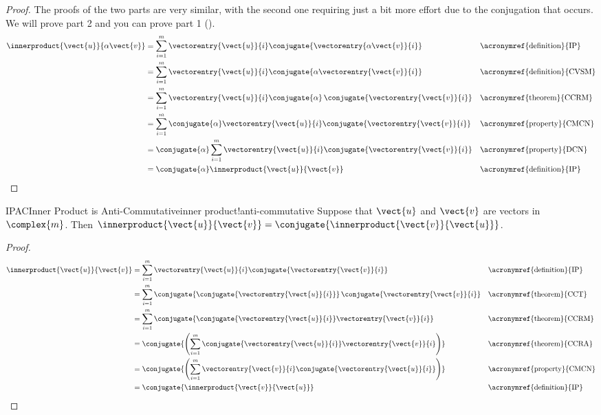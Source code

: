 \begin{proof}
The proofs of the two parts are very similar, with the second one requiring just a bit more effort due to the conjugation that occurs.  We will prove part 2 and you can prove part 1  ().
%
\begin{align*}
\innerproduct{\vect{u}}{\alpha\vect{v}}
&=\sum_{i=1}^{m}\vectorentry{\vect{u}}{i}\conjugate{\vectorentry{\alpha\vect{v}}{i}}
&&\text{\acronymref{definition}{IP}}\\
%
&=\sum_{i=1}^{m}\vectorentry{\vect{u}}{i}\conjugate{\alpha\vectorentry{\vect{v}}{i}}
&&\text{\acronymref{definition}{CVSM}}\\
%
&=\sum_{i=1}^{m}\vectorentry{\vect{u}}{i}\conjugate{\alpha}\,\conjugate{\vectorentry{\vect{v}}{i}}
&&\text{\acronymref{theorem}{CCRM}}\\
%
&=\sum_{i=1}^{m}\conjugate{\alpha}\vectorentry{\vect{u}}{i}\conjugate{\vectorentry{\vect{v}}{i}}
&&\text{\acronymref{property}{CMCN}}\\
%
&=\conjugate{\alpha}\sum_{i=1}^{m}\vectorentry{\vect{u}}{i}\conjugate{\vectorentry{\vect{v}}{i}}
&&\text{\acronymref{property}{DCN}}\\
%
&=\conjugate{\alpha}\innerproduct{\vect{u}}{\vect{v}}
&&\text{\acronymref{definition}{IP}}
%
\end{align*}
%
\end{proof}
%
\begin{theorem}{IPAC}{Inner Product is Anti-Commutative}{inner product!anti-commutative}
Suppose that $\vect{u}$ and $\vect{v}$ are vectors in $\complex{m}$.  Then
$\innerproduct{\vect{u}}{\vect{v}}=\conjugate{\innerproduct{\vect{v}}{\vect{u}}}$.
\end{theorem}
%
\begin{proof}
\begin{align*}
\innerproduct{\vect{u}}{\vect{v}}
&=\sum_{i=1}^{m}\vectorentry{\vect{u}}{i}\conjugate{\vectorentry{\vect{v}}{i}}
&&\text{\acronymref{definition}{IP}}\\
%
&=\sum_{i=1}^{m}\conjugate{\conjugate{\vectorentry{\vect{u}}{i}}}\,\conjugate{\vectorentry{\vect{v}}{i}}
&&\text{\acronymref{theorem}{CCT}}\\
%
&=\sum_{i=1}^{m}\conjugate{\conjugate{\vectorentry{\vect{u}}{i}}\vectorentry{\vect{v}}{i}}
&&\text{\acronymref{theorem}{CCRM}}\\
%
&=\conjugate{\left(\sum_{i=1}^{m}\conjugate{\vectorentry{\vect{u}}{i}}\vectorentry{\vect{v}}{i}\right)}
&&\text{\acronymref{theorem}{CCRA}}\\
%
&=\conjugate{\left(\sum_{i=1}^{m}\vectorentry{\vect{v}}{i}\conjugate{\vectorentry{\vect{u}}{i}}\right)}
&&\text{\acronymref{property}{CMCN}}\\
%
&=\conjugate{\innerproduct{\vect{v}}{\vect{u}}}
&&\text{\acronymref{definition}{IP}}\\
\end{align*}
\end{proof}
